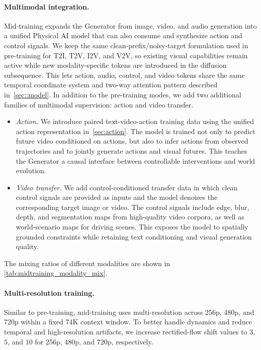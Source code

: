 \paragraph{Multimodal integration.}
Mid-training expands the Generator from image, video, and audio generation into a unified Physical AI model that can also consume and synthesize action and control signals. We keep the same clean-prefix/noisy-target formulation used in pre-training for T2I, T2V, I2V, and V2V, so existing visual capabilities remain active while new modality-specific tokens are introduced in the diffusion subsequence. This lets action, audio, control, and video tokens share the same temporal coordinate system and two-way attention pattern described in~\cref{sec::model}. In addition to the pre-training modes, we add two additional families of multimodal supervision: action and video transfer.
\begin{itemize}
\item \textit{Action.}
We introduce paired text-video-action training data using the unified action representation in~\cref{sec:action}. The model is trained not only to predict future video conditioned on actions, but also to infer actions from observed trajectories and to jointly generate actions and visual futures. This teaches the Generator a causal interface between controllable interventions and world evolution.
\item \textit{Video transfer.}
We add control-conditioned transfer data in which clean control signals are provided as inputs and the model denoises the corresponding target image or video. The control signals include edge, blur, depth, and segmentation maps from high-quality video corpora, as well as world-scenario maps for driving scenes. This exposes the model to spatially grounded constraints while retaining text conditioning and visual generation quality.
\end{itemize}
The mixing ratios of different modalities are shown in \cref{tab:midtraining_modality_mix}.



\paragraph{Multi-resolution training.}
Similar to pre-training, mid-training uses multi-resolution across 256p, 480p, and 720p within a fixed 74K context window. To better handle dynamics and reduce temporal and high-resolution artifacts, we increase rectified-flow shift values to $3$, $5$, and $10$ for 256p, 480p, and 720p, respectively.

